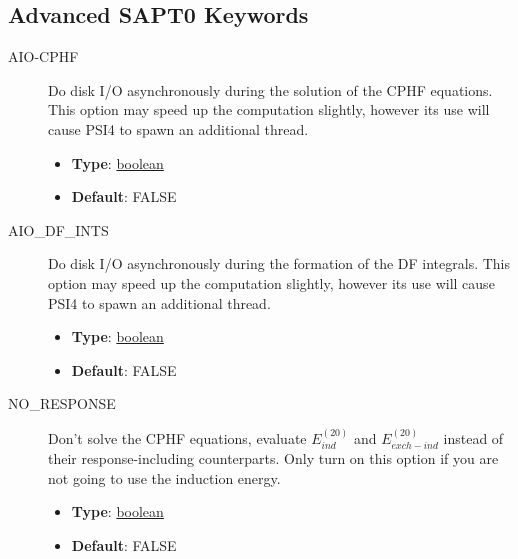 \documentclass[letterpaper,10pt,english]{sphinxmanual}
\begin{document}
\subsection{Advanced SAPT0 Keywords}
\label{index:advanced-sapt0-keywords}\begin{description}
\item[{AIO-CPHF}] \leavevmode{}\label{index:term-aio-cphf}
Do disk I/O asynchronously during the solution of the CPHF equations.
This option may speed up the computation slightly, however its use
will cause PSI4 to spawn an additional thread.
\begin{itemize}
\item {} 
\textbf{Type}: {\hyperref[index:boolean]{boolean}}

\item {} 
\textbf{Default}: FALSE

\end{itemize}

\end{description}
\begin{description}
\item[{AIO\_DF\_INTS}] \leavevmode{}\label{index:term-aio-df-ints}
Do disk I/O asynchronously during the formation of the DF integrals.
This option may speed up the computation slightly, however its use
will cause PSI4 to spawn an additional thread.
\begin{itemize}
\item {} 
\textbf{Type}: {\hyperref[index:boolean]{boolean}}

\item {} 
\textbf{Default}: FALSE

\end{itemize}

\end{description}
\begin{description}
\item[{NO\_RESPONSE}] \leavevmode{}\label{index:term-no-response}
Don't solve the CPHF equations, evaluate $E_{ind}^{(20)}$
and $E_{exch-ind}^{(20)}$ instead of their response-including
counterparts. Only turn on this option if you are not going to
use the induction energy.
\begin{itemize}
\item {} 
\textbf{Type}: {\hyperref[index:boolean]{boolean}}

\item {} 
\textbf{Default}: FALSE

\end{itemize}

\end{description}
\end{document}
